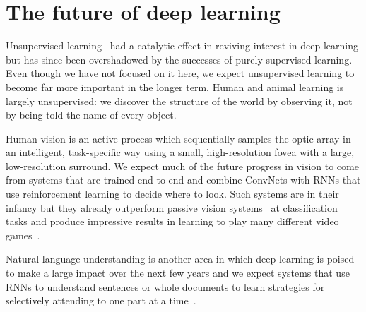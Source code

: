 \documentclass[10pts]{article}
\newcommand{\citep}[1]{\cite{#1}}
\begin{document}





\section{The future of deep learning}

Unsupervised learning~\citep{Hinton95,Salakhutdinov2009-small,VincentPLarochelleH2008-small,
koray-nips-10,gregor-icml-10,ranzato-pami,Bengio-et-al-ICML-2014,Kingma-et-al-NIPS2014} 
had a catalytic effect in reviving interest in
deep learning but has since been overshadowed by the successes of
purely supervised learning. Even though we have not focused on it
here, we expect unsupervised learning to become far more important in
the longer term.  Human and animal learning is largely unsupervised: we discover the
structure of the world by observing it, not by being told the name of
every object. 

Human vision is an active process which sequentially samples the optic
array in an intelligent, task-specific way using a small,
high-resolution fovea with a large, low-resolution surround. We expect
much of the future progress in vision to come from systems that are
trained end-to-end and combine ConvNets with RNNs that use
reinforcement learning to decide where to look. Such systems are in
their infancy but they already outperform passive vision
systems~\citep{ba+mnih} at classification tasks and produce impressive
results in learning to play many different video
games~\citep{Mnih-et-al-2015}.

Natural language understanding is another area in which deep learning
is poised to make a large impact over the next few years and we expect
systems that use RNNs to understand sentences or whole documents to learn
strategies for selectively attending to one part at a
time~\citep{Bahdanau-et-al-ICLR2015-small,Xu-et-al-arxiv2015}.
\end{document}
